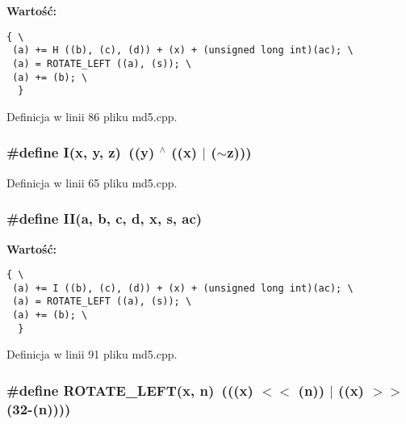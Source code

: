\textbf{Wartość:}

\begin{Code}\begin{verbatim}{ \
 (a) += H ((b), (c), (d)) + (x) + (unsigned long int)(ac); \
 (a) = ROTATE_LEFT ((a), (s)); \
 (a) += (b); \
  }
\end{verbatim}
\end{Code}


Definicja w linii 86 pliku md5.cpp.\hypertarget{a00009_c0eafdc9ee161b71e7af98af736952fd}{
\subsubsection[{I}]{\setlength{\rightskip}{0pt plus 5cm}\#define I(x, \/  y, \/  z)~((y) $^\wedge$ ((x) $|$ ($\sim$z)))}}
\label{a00009_c0eafdc9ee161b71e7af98af736952fd}




Definicja w linii 65 pliku md5.cpp.\hypertarget{a00009_d26626e5efb37b2dadef4e88e35e4329}{
\subsubsection[{II}]{\setlength{\rightskip}{0pt plus 5cm}\#define II(a, \/  b, \/  c, \/  d, \/  x, \/  s, \/  ac)}}
\label{a00009_d26626e5efb37b2dadef4e88e35e4329}


\textbf{Wartość:}

\begin{Code}\begin{verbatim}{ \
 (a) += I ((b), (c), (d)) + (x) + (unsigned long int)(ac); \
 (a) = ROTATE_LEFT ((a), (s)); \
 (a) += (b); \
  }
\end{verbatim}
\end{Code}


Definicja w linii 91 pliku md5.cpp.\hypertarget{a00009_7417fd4e875360c0533fa5b412cdab49}{
\subsubsection[{ROTATE\_\-LEFT}]{\setlength{\rightskip}{0pt plus 5cm}\#define ROTATE\_\-LEFT(x, \/  n)~(((x) $<$$<$ (n)) $|$ ((x) $>$$>$ (32-(n))))}}
\label{a00009_7417fd4e875360c0533fa5b412cdab49}




